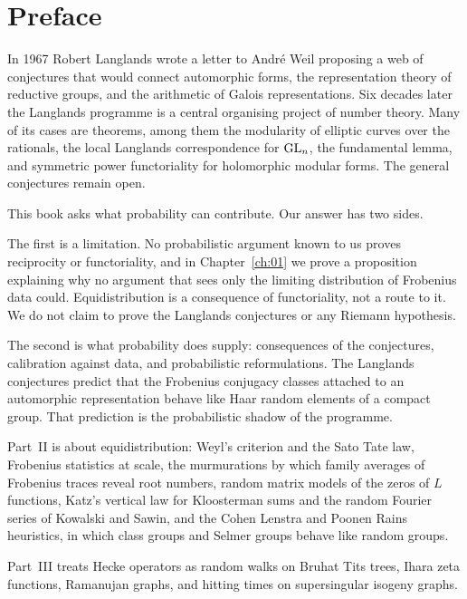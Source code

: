 \chapter*{Preface}

In 1967 Robert Langlands wrote a letter to Andr\'e Weil proposing a web of conjectures that would connect automorphic forms, the representation theory of reductive groups, and the arithmetic of Galois representations. Six decades later the Langlands programme is a central organising project of number theory. Many of its cases are theorems, among them the modularity of elliptic curves over the rationals, the local Langlands correspondence for $\mathrm{GL}_n$, the fundamental lemma, and symmetric power functoriality for holomorphic modular forms. The general conjectures remain open.

This book asks what probability can contribute. Our answer has two sides.

The first is a limitation. No probabilistic argument known to us proves reciprocity or functoriality, and in Chapter~\ref{ch:01} we prove a proposition explaining why no argument that sees only the limiting distribution of Frobenius data could. Equidistribution is a consequence of functoriality, not a route to it. We do not claim to prove the Langlands conjectures or any Riemann hypothesis.

The second is what probability does supply: consequences of the conjectures, calibration against data, and probabilistic reformulations. The Langlands conjectures predict that the Frobenius conjugacy classes attached to an automorphic representation behave like Haar random elements of a compact group. That prediction is the probabilistic shadow of the programme.

Part~II is about equidistribution: Weyl's criterion and the Sato Tate law, Frobenius statistics at scale, the murmurations by which family averages of Frobenius traces reveal root numbers, random matrix models of the zeros of $L$ functions, Katz's vertical law for Kloosterman sums and the random Fourier series of Kowalski and Sawin, and the Cohen Lenstra and Poonen Rains heuristics, in which class groups and Selmer groups behave like random groups.

Part~III treats Hecke operators as random walks on Bruhat Tits trees, Ihara zeta functions, Ramanujan graphs, and hitting times on supersingular isogeny graphs.

